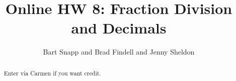 \documentclass[handout,space,nooutcomes]{xourse}
\title{Online HW 8: Fraction Division and Decimals}
\author{Bart Snapp and Brad Findell and Jenny Sheldon}
\begin{document}
\begin{abstract}
Enter via Carmen if you want credit.   
\end{abstract}
\maketitle


\end{document}
